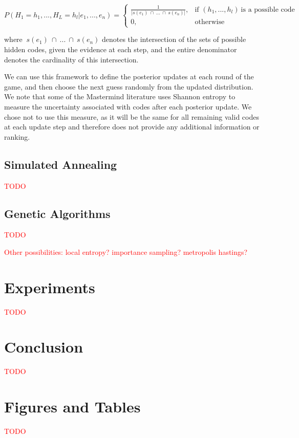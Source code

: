 \documentclass[11pt]{article}
\begin{document}
\[
    P(H_1=h_1, ..., H_L=h_l | e_1, ..., e_n) = 
\begin{cases}
    \frac{1}{| s(e_1) \ \cap \ ... \ \cap \ s(e_n) |},& \text{if } (h_1, ..., h_l) \ \text{is a possible code}\\
    0,              & \text{otherwise}
\end{cases}
\]

\noindent where $\ s(e_1) \ \cap \ ... \ \cap \ s(e_n)$ denotes the intersection of the sets of possible hidden codes, given the evidence at each step, and the entire denominator denotes the cardinality of this intersection.

We can use this framework to define the posterior updates at each round of the game, and then choose the next guess randomly from the updated distribution. We note that some of the Mastermind literature uses Shannon entropy to measure the uncertainty associated with codes after each posterior update. We chose not to use this measure, as it will be the same for all remaining valid codes at each update step and therefore does not provide any additional information or ranking.

\subsection{Simulated Annealing}

\noindent \textcolor{red}{TODO}

\subsection{Genetic Algorithms}

\noindent \textcolor{red}{TODO}

\bigskip
\noindent \textcolor{red}{Other possibilities: local entropy? importance sampling? metropolis hastings?}

\section{Experiments}

\noindent \textcolor{red}{TODO}

\section{Conclusion}

\noindent \textcolor{red}{TODO}


\newpage
\appendix

\section{Figures and Tables}

\noindent \textcolor{red}{TODO}

\newpage

\nocite{runarsson2010adapting}
\nocite{merelo2010finding}
\nocite{doerr2013playing}
\nocite{merelo2013improving}
\nocite{snydermastermind}
\nocite{knuth76}

 

\end{document}
